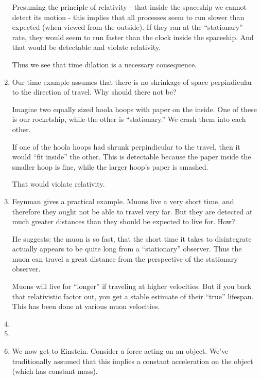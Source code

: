 \begin{enumerate}
  Presuming the principle of relativity - that inside the spaceship we
  cannot detect its motion - this implies that all processes seem to run
  slower than expected (when viewed from the outside). If they ran at
  the ``stationary'' rate, they would seem to run faster than the clock
  inside the spaceship. And that would be detectable and violate
  relativity.

  Thus we see that time dilation is a necessary consequence.

  \item Our time example assumes that there is no shrinkage of space
  perpindicular to the direction of travel. Why should there not be?

  Imagine two equally sized hoola hoops with paper on the inside. One of
  these is our rocketship, while the other is ``stationary.'' We crash
  them into each other.

  If one of the hoola hoops had shrunk perpindicular to the travel, then
  it would ``fit inside'' the other. This is detectable because the
  paper inside the smaller hoop is fine, while the larger hoop's paper
  is smashed.

  That would violate relativity.

  \item Feynman gives a practical example. Muons live a very short time,
  and therefore they ought not be able to travel very far. But they are
  detected at much greater distances than they should be expected to
  live for. How?

  He suggests: the muon is so fast, that the short time it takes to
  disintegrate actually appears to be quite long from a ``stationary''
  observer. Thus the muon can travel a great distance from the
  perspective of the stationary observer.

  Muons will live for ``longer'' if traveling at higher velocities. But
  if you back that relativistic factor out, you get a stable estimate of
  their ``true'' lifespan. This has been done at various muon
  velocities.

  \item {}

  \item {}

  \item We now get to Einstein. Consider a force acting on an object.
  We've traditionally assumed that this implies a constant acceleration
  on the object (which has constant mass).


\end{enumerate}
